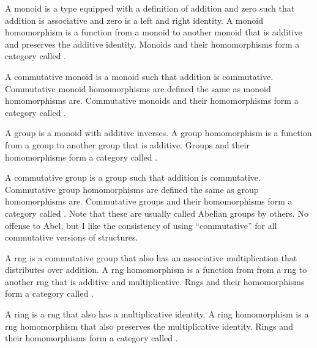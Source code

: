 \documentclass[../math.tex]{subfiles}
\begin{document}
\begin{definition}
    A monoid is a type equipped with a definition of addition and zero such that
    addition is associative and zero is a left and right identity.  A monoid
    homomorphism is a function from a monoid to another monoid that is additive
    and preserves the additive identity.  Monoids and their homomorphisms form a
    category called .
\end{definition}

\begin{definition}
    A commutative monoid is a monoid such that addition is commutative.
    Commutative monoid homomorphisms are defined the same as monoid
    homomorphisms are.  Commutative monoids and their homomorphisms form a
    category called .
\end{definition}

\begin{definition}
    A group is a monoid with additive inverses.  A group homomorphism is a
    function from a group to another group that is additive.  Groups and their
    homomorphisms form a category called .
\end{definition}

\begin{definition}
    A commutative group is a group such that addition is commutative.
    Commutative group homomorphisms are defined the same as group homomorphisms
    are.  Commutative groups and their homomorphisms form a category called
    .  Note that these are usually called Abelian groups by others.
    No offense to Abel, but I like the consistency of using ``commutative'' for
    all commutative versions of structures.
\end{definition}

\begin{definition}
    A rng is a commutative group that also has an associative multiplication
    that distributes over addition.  A rng homomorphism is a function from from
    a rng to another rng that is additive and multiplicative.  Rngs and their
    homomorphisms form a category called .
\end{definition}

\begin{definition}
    A ring is a rng that also has a multiplicative identity.  A ring
    homomorphism is a rng homomorphism that also preserves the multiplicative
    identity.  Rings and their homomorphisms form a category called .
\end{definition}
\end{document}
